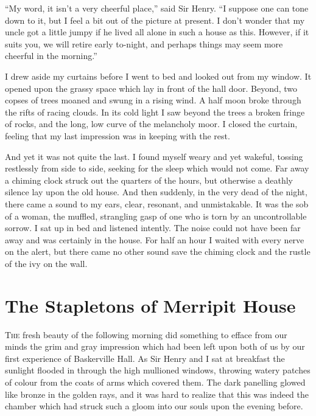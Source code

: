 \documentclass[paper=5.5in:8.5in,BCOR=7mm,twoside,DIV=calc,12pt,usegeometry,openany,chapterprefix,endperiod]{scrbook} %
\begin{document}
\enquote{My word, it isn't a very cheerful place,} said Sir Henry. \enquote{I suppose one can tone down to it, but I feel a bit out of the picture at present. I don't wonder that my uncle got a little jumpy if he lived all alone in such a house as this. However, if it suits you, we will retire early to-night, and perhaps things may seem more cheerful in the morning.}

%

I drew aside my curtains before I went to bed and looked out from my window. It opened upon the grassy space which lay in front of the hall door. Beyond, two copses of trees moaned and swung in a rising wind. A half moon broke through the rifts of racing clouds. In its cold light I saw beyond the trees a broken fringe of rocks, and the long, low curve of the melancholy moor. I closed the curtain, feeling that my last impression was in keeping with the rest.

And yet it was not quite the last. I found myself weary and yet wakeful, tossing restlessly from side to side, seeking for the sleep which would not come. Far away a chiming clock struck out the quarters of the hours, but otherwise a deathly silence lay upon the old house. And then suddenly, in the very dead of the night, there came a sound to my ears, clear, resonant, and unmistakable. It was the sob of a woman, the muffled, strangling gasp of one who is torn by an uncontrollable sorrow. I sat up in bed and listened intently. The noise could not have been far away and was certainly in the house. For half an hour I waited with every nerve on the alert, but there came no other sound save the chiming clock and the rustle of the ivy on the wall.

\chapter{The Stapletons of Merripit House}
\lettrine[lines=1]{T}{he} fresh beauty of the following morning did something to efface from our minds the grim and gray impression which had been left upon both of us by our first experience of Baskerville Hall. As Sir Henry and I sat at breakfast the sunlight flooded in through the high mullioned windows, throwing watery patches of colour from the coats of arms which covered them. The dark panelling glowed like bronze in the golden rays, and it was hard to realize that this was indeed the chamber which had struck such a gloom into our souls upon the evening before.
\end{document}
